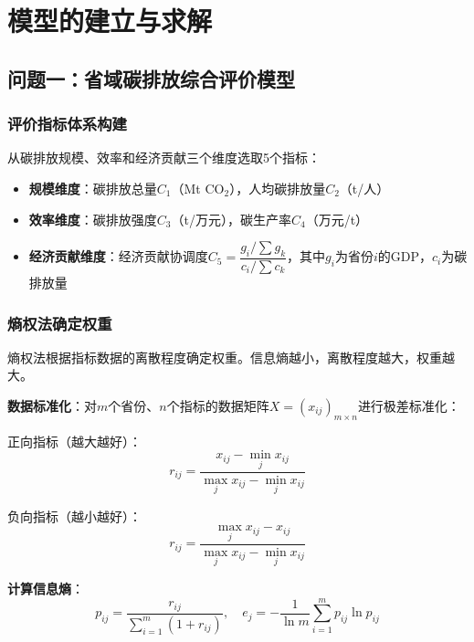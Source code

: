 \documentclass[12pt, a4paper]{article}
\begin{document}
\section{模型的建立与求解}

\subsection{问题一：省域碳排放综合评价模型}

\subsubsection{评价指标体系构建}

从碳排放规模、效率和经济贡献三个维度选取5个指标：

\begin{itemize}
    \item \textbf{规模维度}：碳排放总量$C_1$（Mt CO$_2$），人均碳排放量$C_2$（t/人）
    \item \textbf{效率维度}：碳排放强度$C_3$（t/万元），碳生产率$C_4$（万元/t）
    \item \textbf{经济贡献维度}：经济贡献协调度$C_5 = \dfrac{g_i / \sum g_k}{c_i / \sum c_k}$，其中$g_i$为省份$i$的GDP，$c_i$为碳排放量
\end{itemize}

\subsubsection{熵权法确定权重}

熵权法根据指标数据的离散程度确定权重。信息熵越小，离散程度越大，权重越大。

\textbf{数据标准化}：对$m$个省份、$n$个指标的数据矩阵$X = (x_{ij})_{m\times n}$进行极差标准化：

正向指标（越大越好）：
\begin{equation}
r_{ij} = \frac{x_{ij} - \min_j x_{ij}}{\max_j x_{ij} - \min_j x_{ij}}
\label{eq:norm_pos}
\end{equation}

负向指标（越小越好）：
\begin{equation}
r_{ij} = \frac{\max_j x_{ij} - x_{ij}}{\max_j x_{ij} - \min_j x_{ij}}
\label{eq:norm_neg}
\end{equation}

\textbf{计算信息熵}：
\begin{equation}
p_{ij} = \frac{r_{ij}}{\sum_{i=1}^{m} (1 + r_{ij})}, \quad
e_j = -\frac{1}{\ln m}\sum_{i=1}^{m} p_{ij} \ln p_{ij}
\label{eq:entropy}
\end{equation}
\end{document}
